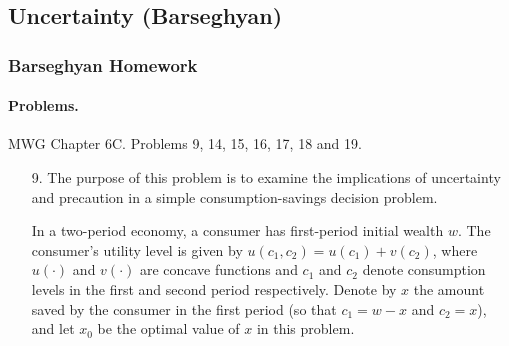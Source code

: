 \documentclass[12pt]{article}
\begin{document}
\newpage
\subsection{Uncertainty (Barseghyan)}

\subsubsection{Barseghyan Homework}

\paragraph{Problems.} MWG Chapter 6C. Problems 9, 14, 15, 16, 17, 18 and 19.

\begin{itemize}
	\item[9.] The purpose of this problem is to examine the implications of uncertainty and precaution in a simple consumption-savings decision problem.
	
	In a two-period economy, a consumer has first-period initial wealth $w$. The consumer's utility level is given by $u(c_1,c_2) = u(c_1) + v(c_2)$, where $u(\cdot)$ and $v(\cdot)$ are concave functions and $c_1$ and $c_2$ denote consumption levels in the first and second period respectively. Denote by $x$ the amount saved by the consumer in the first period (so that $c_1 = w-x$ and $c_2 = x$), and let $x_0$ be the optimal value of $x$ in this problem.
	

\end{itemize}
\end{document}
